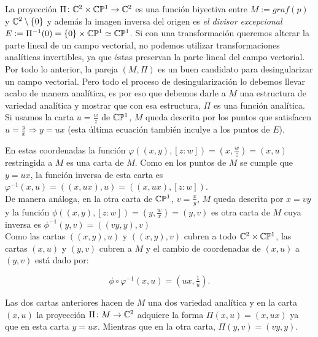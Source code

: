 La proyección $\Pi\colon\mathbb{C}^{2}\times\mathbb{C}\mathbb{P}^{1}\rightarrow\mathbb{C}^{2}$ es una función biyectiva entre $M:=graf(p)$ y $\mathbb{C}^{2}\setminus\{0\}$ y además la imagen inversa del origen es \emph{el divisor excepcional} $E:=\Pi^{-1}(0)=\{0\}\times\mathbb{C}\mathbb{P}^{1}\simeq\mathbb{C}\mathbb{P}^{1}$. Si con una transformación queremos alterar la parte lineal de un campo vectorial, no podemos utilizar transformaciones analíticas invertibles, ya que éstas preservan la parte lineal del campo vectorial.\\

Por todo lo anterior, la pareja $(M,\Pi)$ es un buen candidato para desingularizar un campo vectorial. Pero todo el proceso de desingularización lo debemos llevar acabo de manera analítica, es por eso que debemos darle a $M$ una estructura de variedad analítica y mostrar que con esa estructura, $\Pi$ es una función analítica.\\   

Si usamos la carta $u=\tfrac{w}{z}$ de $\mathbb{C}\mathbb{P}^{1}$, $M$ queda descrita por los puntos que satisfacen $u=\tfrac{y}{x}\Rightarrow y=ux$ (esta última ecuación también inculye a los puntos de $E$).

En estas coordenadas la función $\varphi((x,y),[z:w])=(x,\tfrac{w}{z})=(x,u)$ restringida a $M$ es una carta de $M$. Como en los puntos de $M$ se cumple que $y=ux$, la función inversa de esta carta es $\varphi^{-1}(x,u)=((x,ux),u)=((x,ux),[z:w])$.\\

De manera análoga, en la otra carta de $\mathbb{C}\mathbb{P}^{1}$, $v=\tfrac{x}{y}$, $M$ queda descrita por $x=vy$ y la función $\phi((x,y),[z:w])=(y,\tfrac{w}{x})=(y,v)$ es otra carta de $M$ cuya inversa es $\phi^{-1}(y,v)=((vy,y),v)$\\

Como las cartas $((x,y),u)$ y $((x,y),v)$ cubren a todo $\mathbb{C}^{2}\times\mathbb{C}\mathbb{P}^{1}$, las cartas $(x,u)$ y $(y,v)$ cubren a $M$ y el cambio de coordenadas de $(x,u)$ a $(y,v)$ está dado por:

\begin{equation}
\label{CambiosCoordenadasExplosion}
\phi\circ\varphi^{-1}(x,u)=(ux,\tfrac{1}{u}).
\end{equation}

Las dos cartas anteriores hacen de $M$ una dos variedad analítica y en la carta $(x,u)$ la proyección $\Pi\colon M\rightarrow\mathbb{C}^{2}$ adquiere la forma $\Pi(x,u)=(x,ux)$ ya que en esta carta $y=ux$. Mientras que en la otra carta, $\Pi(y,v)=(vy,y)$.\\


